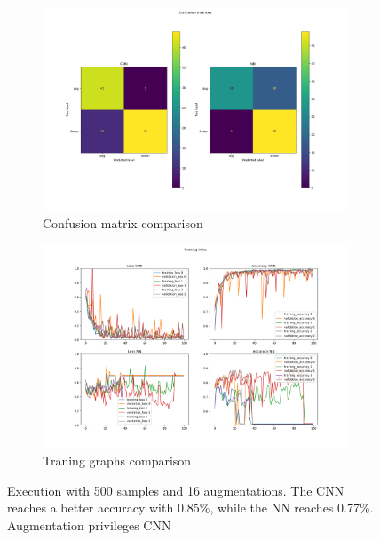 \documentclass{report}
\begin{document}
\begin{figure}[t!]
  \centering
  \hspace{-2cm}
  \begin{subfigure}[t]{0.49\textwidth}
    \centering
    \includegraphics[width=1.3\textwidth]{10.500_aug16/conf_mat.png}
    \caption{Confusion matrix comparison}
    \label{fig:image-set6-sub1}
  \end{subfigure}
  \hfill
  \begin{subfigure}[t]{0.49\textwidth}
    \centering
    \includegraphics[width=1.3\textwidth]{10.500_aug16/training_infos.png}
    \caption{Traning graphs comparison}
    \label{fig:image-set6-sub2}
  \end{subfigure}

  \caption{Execution with 500 samples and 16 augmentations. The CNN reaches a better accuracy with 0.85\%, while the NN reaches 0.77\%. Augmentation privileges CNN}
  \label{fig:image-set6}
\end{figure}
\end{document}
